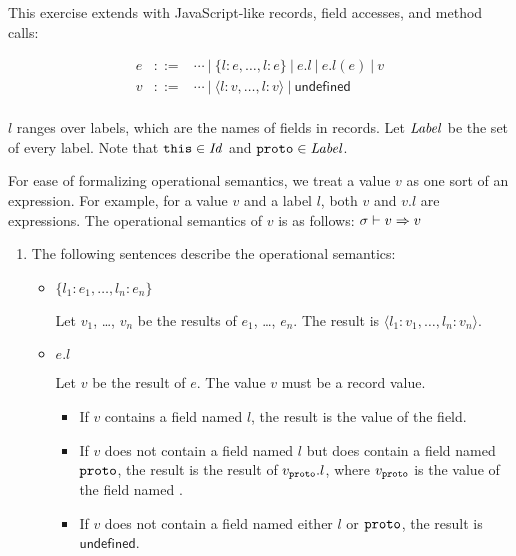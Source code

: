 \begin{exercise}

This exercise extends \lang with JavaScript-like records, field accesses,
  and method calls:

\[
\begin{array}{rcl}
  e & ::= & \cdots\ |\ \{l:e,\ldots,l:e\}\ |\ e.l\ |\ e.l(e)\ |\ v \\
  v & ::= & \cdots\ |\ \langle l:v,\ldots,l:v\rangle \ |\ \textsf{undefined} \\
\end{array}
\]

$l$ ranges over labels, which are the names of fields in records.
Let $\mbox{\emph{Label}}$ be the set of every label.
Note that $\texttt{this}\in\mbox{\emph{Id}}$ and $\texttt{proto}\in\mbox{\emph{Label}}$.

For ease of formalizing operational semantics, we treat a value $v$ as one sort
of an expression. For example, for a value $v$ and a label $l$, both $v$ and
$v.l$ are expressions.
The operational semantics of $v$ is as follows: $\sigma\vdash v\Rightarrow v$

\begin{enumerate}
  \item
    The following sentences describe the operational semantics:
    \begin{itemize}
      \item $\{l_1:e_1,\ldots,l_n:e_n\}$

        Let $v_1$, \ldots, $v_n$ be the results of $e_1$, \ldots, $e_n$.
        The result is $\langle l_1:v_1,\ldots,l_n:v_n\rangle$.

      \item $e.l$

        Let $v$ be the result of $e$. The value $v$ must be a record value.
        \begin{itemize}
          \item If $v$ contains a field named $l$, the result is the value of the
            field.
          \item If $v$ does not contain a field named $l$ but does contain a field
            named $\texttt{proto}$,
            the result is the result of $v_{\texttt{proto}}.l$, where
            $v_{\texttt{proto}}$ is the value of the field named .
          \item
            If $v$ does not contain a field named either $l$ or $\texttt{proto}$,
            the result is $\textsf{undefined}$.
        \end{itemize}


\end{itemize}
\end{enumerate}
\end{exercise}
